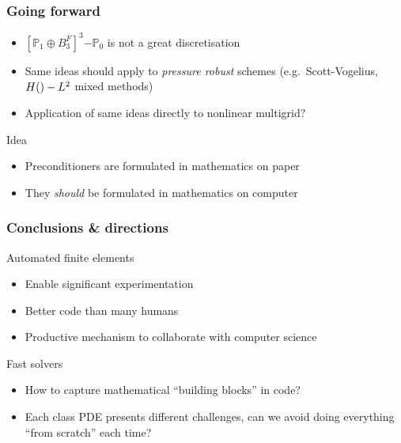 \documentclass[presentation]{beamer}
\let\div\relax
\DeclareMathOperator{\div}{div}
\newcommand{\BR}{\ensuremath{\left[\mathbb{P}_1 \oplus B^F_3\right]}\xspace}
\newcommand{\BRzero}{\ensuremath{\BR^3\mathrm{-}\mathbb{P}_0}\xspace}
\begin{document}
\begin{frame}
  \frametitle{Going forward}
  \begin{itemize}
  \item $\BRzero$ is not a great discretisation
  \item Same ideas should apply to \emph{pressure robust} schemes
    (e.g.~Scott-Vogelius, $H(\div)-L^2$ mixed methods)
  \item Application of same ideas directly to nonlinear multigrid?
  \end{itemize}
  \begin{block}{Idea}
    \begin{itemize}
    \item Preconditioners are formulated in mathematics on paper
    \item They \emph{should} be formulated in mathematics on computer
    \end{itemize}
  \end{block}
\end{frame}
\begin{frame}
  \frametitle{Conclusions \& directions}
  \begin{block}{Automated finite elements}
    \begin{itemize}
    \item Enable significant experimentation
    \item Better code than many humans
    \item Productive mechanism to collaborate with computer science
    \end{itemize}
  \end{block}
  \begin{block}{Fast solvers}
    \begin{itemize}
    \item How to capture mathematical ``building blocks'' in code?
    \item Each class PDE presents different challenges, can we avoid
      doing everything ``from scratch'' each time?
    \end{itemize}
  \end{block}
\end{frame}
\end{document}
